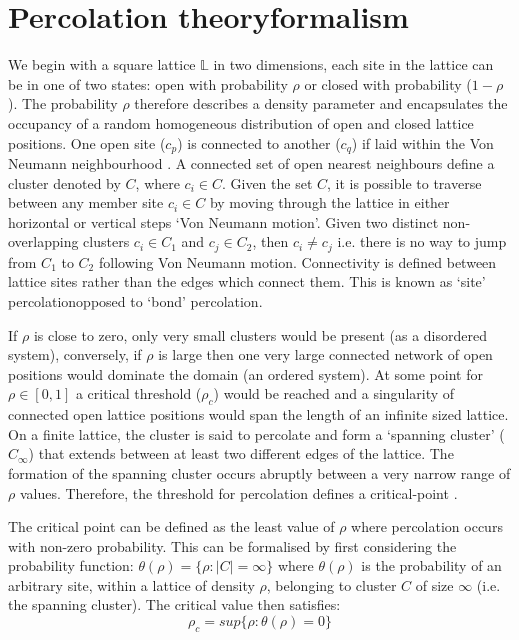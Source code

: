 \section{Percolation theory\textemdash formalism}
We begin with a square lattice $\mathbb{L}$ in two dimensions, each site in the lattice can be in one of two states: %
open with probability $\rho$ or closed with probability ($1-\rho$). %
The probability $\rho$ therefore describes a density parameter and encapsulates the occupancy of a random %
homogeneous distribution of open and closed lattice positions. %
One open site ($c_p$) is connected to another ($c_q$) if laid within the Von Neumann neighbourhood \citep[see][p 50]{toffoli1987cellular}. %
A connected set of open nearest neighbours define a cluster denoted by $C$, where $c_i \in C$.%
Given the set $C$, it is possible to traverse between any member site $c_i \in C$ by moving through the lattice in either horizontal or vertical steps `Von Neumann motion'. %
Given two distinct non-overlapping clusters $c_i \in C_1$ and $c_j \in C_2$, then $c_i \neq c_j $ i.e. there is no way to jump from $C_1$ to $C_2$ following Von Neumann motion. %
Connectivity is defined between lattice sites rather than the edges which connect them. %
This is known as `site' percolation\textemdash opposed to `bond' percolation. %

If $\rho$ is close to zero, only very small clusters would be present (as a disordered system), %
conversely, if $\rho$ is large then one very large connected network of open positions would dominate the domain (an ordered system). %
At some point for $\rho \in [0, 1]$ a critical threshold ($\rho_c$) would be reached and a singularity of connected open lattice positions would span the length of an infinite sized lattice. %
On a finite lattice, the cluster is said to percolate and form a `spanning cluster' ($C_\infty$) that extends between at least two different edges of the lattice. %
The formation of the spanning cluster occurs abruptly between a very narrow range of $\rho$ values. %
Therefore, the threshold for percolation defines a critical-point \citep[see][]{STAUFFER19791}. %

The critical point can be defined as the least value of $\rho$ where percolation occurs with non-zero probability. %
This can be formalised by first considering the probability function: $\theta (\rho)= \lbrace \rho:|C|=\infty\rbrace$ where $\theta(\rho)$ is the probability of an arbitrary site, %
within a lattice of density $\rho$, belonging to cluster $C$ of size $\infty$ (i.e. the spanning cluster). %
The critical value then satisfies: %
\begin{equation}
\label{eq:critical_threshold_1d}
    \rho _{c}=sup \lbrace \rho : \theta (\rho ) = 0 \rbrace
\end{equation}

